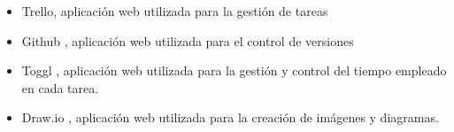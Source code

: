 \documentclass[11pt,a4paper,twoside,final]{article}
\begin{document}
\begin{itemize}
    \begin{itemize}
        \item Trello, aplicación web utilizada para la gestión de tareas
        \item Github \cite{github}, aplicación web utilizada para el control de versiones \cite{git}
        \item Toggl \cite{toggl}, aplicación web utilizada para la gestión y control del tiempo empleado en cada tarea.
        \item Draw.io \cite{drawio}, aplicación web utilizada para la creación de imágenes y diagramas.
    \end{itemize}
\end{itemize}

\newpage
{} %

\nocite{*} %
\printbibliography[title=Bibliografía]
\end{document}
